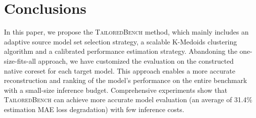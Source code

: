 

\section{Conclusions}
In this paper, we propose the \textsc{TailoredBench} method, which mainly includes an adaptive source model set selection strategy, a scalable K-Medoids clustering algorithm and a calibrated performance estimation strategy. 
Abandoning the one-size-fits-all approach, we have customized the evaluation on the constructed native coreset for each target model.
This approach enables a more accurate reconstruction and ranking of the model's performance on the entire benchmark with a small-size inference budget. 
Comprehensive experiments show that \textsc{TailoredBench} can achieve more accurate model evaluation (an average of 31.4\% estimation MAE loss degradation) with few inference costs.

